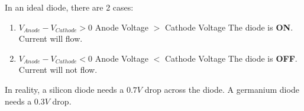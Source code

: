\documentclass[10pt,letterpaper,final,twoside,notitlepage]{article}
\begin{document}
	In an ideal diode, there are 2 cases:
	\begin{enumerate}
		\item $V_{Anode}-V_{Cathode}>0$ Anode Voltage $>$ Cathode Voltage \newline
			The diode is \textbf{ON}. Current will flow.
		\item $V_{Anode}-V_{Cathode}<0$ Anode Voltage $<$ Cathode Voltage \newline
			The diode is \textbf{OFF}. Current will not flow.
	\end{enumerate}
	
	In reality, a silicon diode needs a $0.7V$ drop across the diode. A germanium diode needs a $0.3V$ drop. 
\end{document}
